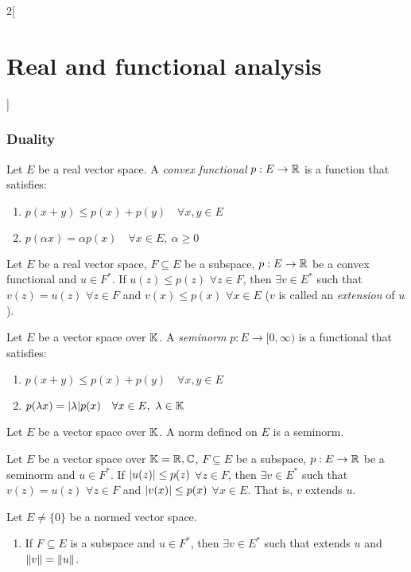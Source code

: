 \documentclass[../../../main_math.tex]{subfiles}
\begin{document}
\begin{multicols}{2}[\section{Real and functional analysis}]
  \subsubsection{Duality}
  \begin{definition}
    Let $E$ be a real vector space. A \emph{convex functional} $p:E\rightarrow\mathbb{R}$ is a function that satisfies:
    \begin{enumerate}
      \item $p(x+y)\leq p(x)+p(y)\quad\forall x,y\in E$
      \item $p(\alpha x)=\alpha p(x)\quad\forall x\in E,\ \alpha\geq 0$
    \end{enumerate}
  \end{definition}
  \begin{theorem}
    Let $E$ be a real vector space, $F\subseteq E$ be a subspace, $p:E\rightarrow\mathbb{R}$ be a convex functional and $u\in F^*$. If $u(z)\leq p(z)$ $\forall z\in F$, then $\exists v\in E^*$ such that $v(z)=u(z)$ $\forall z\in F$ and $v(x)\leq p(x)$ $\forall x\in E$ ($v$ is called an \emph{extension} of $u$).
  \end{theorem}
  \begin{definition}[Seminorm]
    Let $E$ be a vector space over $\mathbb{K}$. A \emph{seminorm} $p:E\rightarrow[0,\infty)$ is a functional that satisfies:
    \begin{enumerate}
      \item $p(x+y)\leq p(x)+p(y)\quad\forall x,y\in E$
      \item $p(\lambda x)=\abs{\lambda} p(x)\quad\forall x\in E,\ \lambda\in\mathbb{K}$
    \end{enumerate}
  \end{definition}
  \begin{lemma}
    Let $E$ be a vector space over $\mathbb{K}$. A norm defined on $E$ is a seminorm.
  \end{lemma}
  \begin{theorem}
    Let $E$ be a vector space over $\mathbb{K}=\mathbb{R},\mathbb{C}$, $F\subseteq E$ be a subspace, $p:E\rightarrow\mathbb{R}$ be a seminorm and $u\in F^*$. If $\abs{u(z)}\leq p(z)$ $\forall z\in F$, then $\exists v\in E^*$ such that $v(z)=u(z)$ $\forall z\in F$ and $\abs{v(x)}\leq p(x)$ $\forall x\in E$. That is, $v$ extends $u$.
  \end{theorem}
  \begin{theorem}
    Let $E\ne\{0\}$ be a normed vector space.
    \begin{enumerate}
      \item If $F\subseteq E$ is a subspace and $u\in F^*$, then $\exists v\in E^*$ such that extends $u$ and $\left\|v\right\|=\left\|u\right\|$.

\end{enumerate}
\end{theorem}
\end{multicols}
\end{document}
